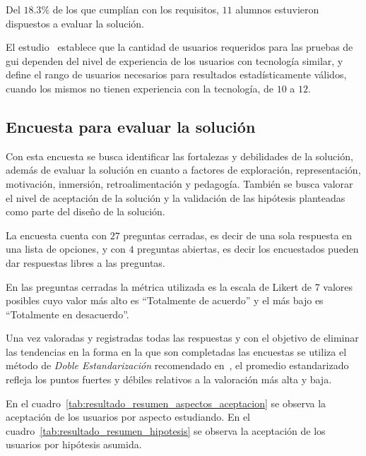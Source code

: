 Del $18.3\%$ de los que cumplían con los requisitos, $11$ alumnos estuvieron
dispuestos a evaluar la solución. 

El estudio~\cite{nielsen2000} establece que la cantidad de usuarios requeridos
para las pruebas de \gls{gui} dependen del nivel de experiencia de los usuarios
con tecnología similar, y~\cite{ritch2009} define el rango de usuarios
necesarios para resultados estadísticamente válidos, cuando los mismos no tienen experiencia con la tecnología, de $10$ a $12$.


\subsection{Encuesta para evaluar la solución}
\label{encuesta_solucion}

Con esta encuesta se busca identificar las fortalezas y debilidades de la
solución, además de evaluar la solución en cuanto a factores de exploración,
representación, motivación, inmersión, retroalimentación y pedagogía. También se
busca valorar el nivel de aceptación de la solución y la validación de las
hipótesis planteadas como parte del diseño de la solución.

La encuesta cuenta con $27$ preguntas cerradas, es decir de una sola respuesta
en una lista de opciones, y con $4$ preguntas abiertas, es decir los encuestados
pueden dar respuestas libres a las preguntas. 

En las preguntas cerradas la métrica utilizada es la escala de Likert
\cite{Allen:2007} de 7 valores posibles cuyo valor más alto es
\enquote{Totalmente de acuerdo} y el más bajo es \enquote{Totalmente en
    desacuerdo}. 

Una vez valoradas y registradas todas las respuestas y con el 
objetivo de eliminar las tendencias en la forma en la que son completadas las
encuestas\cite{Fischer2010} se utiliza el método de \emph{Doble 
Estandarización} recomendado en~\cite{Pagolu2011}, el promedio estandarizado 
refleja los puntos fuertes y débiles relativos a la valoración más alta y baja.

En el cuadro~\ref{tab:resultado_resumen_aspectos_aceptacion} se observa 
la aceptación de los usuarios por aspecto estudiando. En el 
cuadro~\ref{tab:resultado_resumen_hipotesis} se observa la aceptación
de los usuarios por hipótesis asumida.  

